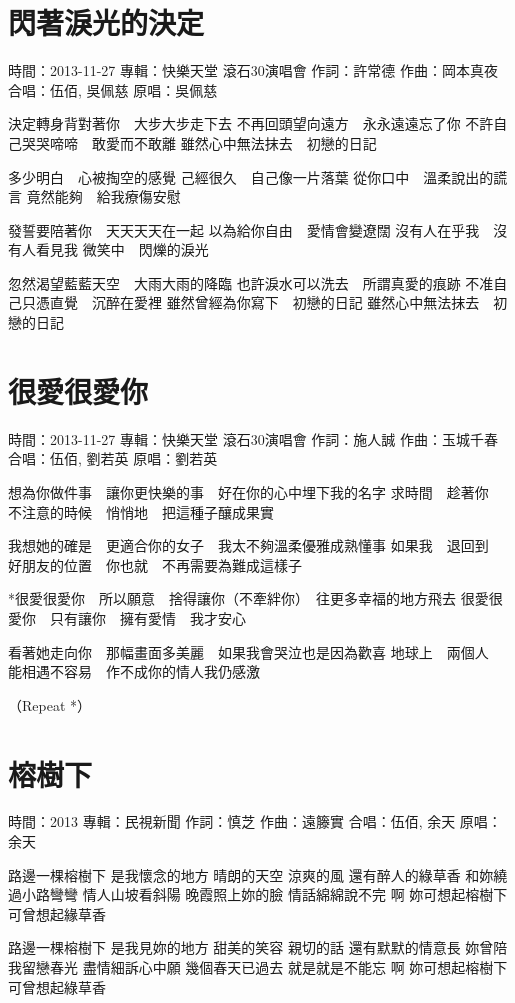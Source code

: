 \documentclass[UTF8,a4paper,oneside,twocolumn,12pt]{ctexbook}
\newcommand{\infopair}[2]{\textbullet #1：#2}
\newcommand{\zc}[1][伍佰]{\infopair{作詞}{#1}}
\newcommand{\zq}[1][伍佰]{\infopair{作曲}{#1}}
\newcommand{\zj}[1]{\infopair{專輯}{#1}}
\newcommand{\yc}[1]{\infopair{原唱}{#1}}
\newcommand{\sj}[1]{\infopair{時間}{#1}}
\newenvironment{info}{\begin{flushleft}\kaishu
	}
	{\end{flushleft}\normalsize\yahei\par}
\newenvironment{lyric}{
	}
{}
\begin{document}
\section{閃著淚光的決定}
\begin{info}
	\sj{2013-11-27}
	\zj{快樂天堂 滾石30演唱會}
	\zc[許常德]
	\zq[岡本真夜]
	\infopair{合唱}{伍佰, 吳佩慈}
	\yc{吳佩慈}
\end{info}
\begin{lyric}
	決定轉身背對著你　大步大步走下去
	不再回頭望向遠方　永永遠遠忘了你
	不許自己哭哭啼啼　敢愛而不敢離
	雖然心中無法抹去　初戀的日記

	多少明白　心被掏空的感覺
	己經很久　自己像一片落葉
	從你口中　溫柔說出的謊言
	竟然能夠　給我療傷安慰

	發誓要陪著你　天天天天在一起
	以為給你自由　愛情會變遼闊
	沒有人在乎我　沒有人看見我
	微笑中　閃爍的淚光

	忽然渴望藍藍天空　大雨大雨的降臨
	也許淚水可以洗去　所謂真愛的痕跡
	不准自己只憑直覺　沉醉在愛裡
	雖然曾經為你寫下　初戀的日記
	雖然心中無法抹去　初戀的日記
\end{lyric}

\section{很愛很愛你}
\begin{info}
	\sj{2013-11-27}
	\zj{快樂天堂 滾石30演唱會}
	\zc[施人誠]
	\zq[玉城千春]
	\infopair{合唱}{伍佰, 劉若英}
	\yc{劉若英}
\end{info}
\begin{lyric}
	想為你做件事　讓你更快樂的事　好在你的心中埋下我的名字
	求時間　趁著你　不注意的時候　悄悄地　把這種子釀成果實

	我想她的確是　更適合你的女子　我太不夠溫柔優雅成熟懂事
	如果我　退回到　好朋友的位置　你也就　不再需要為難成這樣子

	*很愛很愛你　所以願意　捨得讓你（不牽絆你）　往更多幸福的地方飛去
	很愛很愛你　只有讓你　擁有愛情　我才安心

	看著她走向你　那幅畫面多美麗　如果我會哭泣也是因為歡喜
	地球上　兩個人　能相遇不容易　作不成你的情人我仍感激

	（Repeat *）
\end{lyric}

\section{榕樹下} %
\begin{info}
	\sj{2013}
	\zj{民視新聞}
	\zc[慎芝]
	\zq[遠籐實]
	\infopair{合唱}{伍佰, 余天}
	\yc{余天}
\end{info}
\begin{lyric}
	路邊一棵榕樹下 是我懷念的地方
	晴朗的天空 涼爽的風
	還有醉人的綠草香
	和妳繞過小路彎彎 情人山坡看斜陽
	晚霞照上妳的臉 情話綿綿說不完 啊
	妳可想起榕樹下 可曾想起緣草香

	路邊一棵榕樹下 是我見妳的地方
	甜美的笑容 親切的話 還有默默的情意長
	妳曾陪我留戀春光 盡情細訴心中願
	幾個春天已過去 就是就是不能忘
	啊 妳可想起榕樹下 可曾想起綠草香
\end{lyric}
\end{document}
